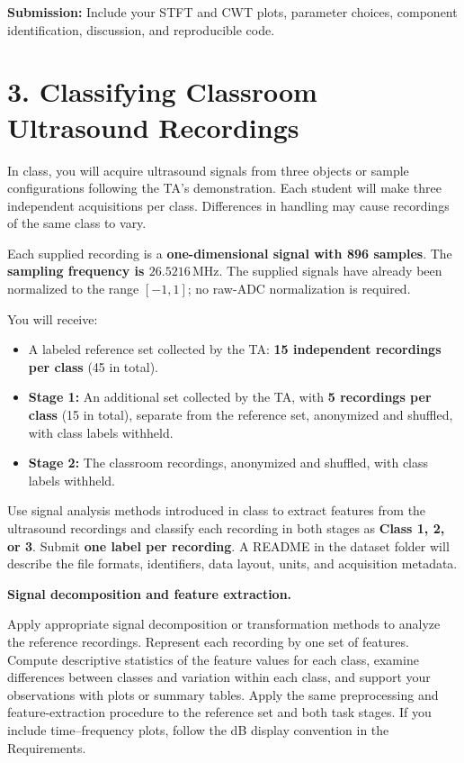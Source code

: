 \documentclass[11pt,a4paper]{article}
\begin{document}
\textbf{Submission:} Include your STFT and CWT plots, parameter
choices, component identification, discussion, and reproducible code.
\newpage
\section*{3. Classifying Classroom Ultrasound Recordings}

In class, you will acquire ultrasound signals from three objects or sample
configurations following the TA's demonstration. Each student will make
three independent acquisitions per class. Differences in handling may cause
recordings of the same class to vary.

Each supplied recording is a \textbf{one-dimensional signal with 896 samples}.
The \textbf{sampling frequency is $26.5216\,\mathrm{MHz}$}. The supplied signals
have already been normalized to the range $[-1,1]$; no raw-ADC normalization
is required.

You will receive:
\begin{itemize}[leftmargin=1.5em]
    \item A labeled reference set collected by the TA:
    \textbf{15 independent recordings per class} (45 in total).
    \item \textbf{Stage 1:} An additional set collected by the TA, with
    \textbf{5 recordings per class} (15 in total), separate from the reference set,
    anonymized and shuffled, with class labels withheld.
    \item \textbf{Stage 2:} The classroom recordings, anonymized and shuffled,
    with class labels withheld.
\end{itemize}

Use signal analysis methods introduced in class to extract features from the
ultrasound recordings and classify each recording in both stages as \textbf{Class 1,
2, or 3}. Submit \textbf{one label per recording}. A README in the dataset
folder will describe the file formats, identifiers, data layout, units,
and acquisition metadata.

\textbf{Signal decomposition and feature extraction.}

Apply appropriate signal decomposition or transformation methods to analyze
the reference recordings. Represent each recording by one set of features.
Compute descriptive statistics of the feature values for each class, examine
differences between classes and variation within each class, and support your
observations with plots or summary tables. Apply the same preprocessing and
feature-extraction procedure to the reference set and both task stages.
If you include time--frequency plots, follow the dB display convention in the
Requirements.
\end{document}
